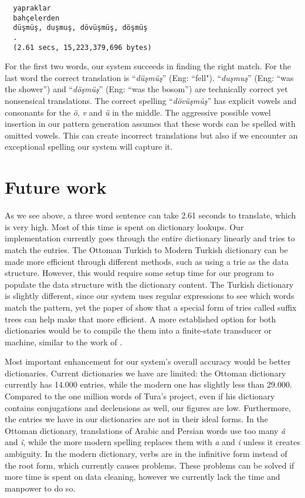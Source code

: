 \documentclass[10pt,twocolumn]{article}
\theoremstyle{nonumberplain}
\newcommand{\word}[1]{``\emph{#1}''}
\begin{document}
\begin{verbatim}
  yapraklar
  bahçelerden
  düşmüş, duşmuş, dövüşmüş, döşmüş
  .
  (2.61 secs, 15,223,379,696 bytes)
\end{verbatim}

For the first two words, our system succeeds in finding the right match. For
the last word the correct translation is \word{düşmüş} (Eng: ``fell").
\word{duşmuş} (Eng: ``was the shower'') and \word{döşmüş} (Eng: ``was the
bosom'') are technically correct yet nonsensical translations.
The correct spelling \word{dövüşmüş} has explicit vowels and consonants for the
\emph{ö}, \emph{v} and \emph{ü} in the middle. The aggressive possible vowel
insertion in our pattern generation assumes that these words can be spelled
with omitted vowels. This can create incorrect translations but also if we
encounter an exceptional spelling our system will capture it.

\section{Future work}

As we see above, a three word sentence can take 2.61 seconds to translate,
which is very high. Most of this time is spent on dictionary lookups. Our
implementation currently goes through the entire dictionary linearly and tries
to match the entries. The Ottoman Turkish to Modern Turkish dictionary can be
made more efficient through different methods, such as using a trie as the data
structure. However, this would require some setup time for our program to
populate the data structure with the dictionary content. The Turkish dictionary
is slightly different, since our system uses regular expressions to see which
words match the pattern, yet the paper of \citet{baeza1996fast} show that a
special form of tries called suffix trees can help make that more efficient.
A more established option for both dictionaries would be to compile the them
into a finite-state transducer or machine, similar to the work of
\citet{coltekin2010freely}.

Most important enhancement for our system's overall accuracy would be better dictionaries. Current dictionaries we have are limited: the Ottoman dictionary currently has 14.000 entries, while the modern one has slightly less than 29.000. Compared to the one million words of Tura's project, even if his dictionary contains conjugations and declensions as well, our figures are low. Furthermore, the entries we have in our dictionaries are not in their ideal forms.
In the Ottoman dictionary, translations of Arabic and Persian words use too
many \emph{â} and \emph{î}, while the more modern spelling replaces them with
\emph{a} and \emph{i} unless it creates ambiguity.
In the modern dictionary, verbs are in the infinitive form instead of the root form, which currently causes problems. These problems can be solved if more time is spent on data cleaning, however we currently lack the time and manpower to do so.
\end{document}
